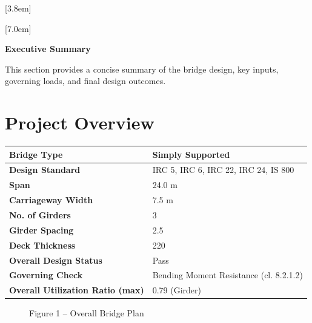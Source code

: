 \documentclass[12pt,a4paper]{report}
\numberwithin{table}{chapter}
\numberwithin{figure}{chapter}
\begin{document}
[3.8em]
  {\normalfont}
  {\contentslabel{2.3em}}
  {\hspace*{-2.3em}}
  {\hfill\contentspage}

[7.0em]
  {\normalfont}
  {\contentslabel{3.2em}}
  {\hspace*{-3.2em}}
  {\hfill\contentspage}

\newpage
\renewcommand{\contentsname}{\centering\Large\bfseries Table of Contents}
\tableofcontents


\newpage
{\centering\Large\bfseries Executive Summary\par}
\vspace{0.8em}

This section provides a concise summary of the bridge design, key inputs, governing loads, and final design outcomes.

\section*{Project Overview}
\label{sec:project-overview}


\begin{tabular}{|L{5.5cm}|L{8.5cm}|}
\hline
\textbf{Bridge Type} & Simply Supported \\
\hline
\textbf{Design Standard} & IRC 5, IRC 6, IRC 22, IRC 24, IS 800 \\
\hline
\textbf{Span} & 24.0 m \\
\hline
\textbf{Carriageway Width} & 7.5 m \\
\hline
\textbf{No. of Girders} & 3 \\
\hline
\textbf{Girder Spacing} & 2.5 \\
\hline
\textbf{Deck Thickness} & 220 \\
\hline
\textbf{Overall Design Status} & Pass \\
\hline
\textbf{Governing Check} & Bending Moment Resistance (cl. 8.2.1.2) \\
\hline
\textbf{Overall Utilization Ratio (max)} & 0.79 (Girder) \\
\hline
\end{tabular}


\begin{figure}[H]
\centering
{}
\caption*{Figure 1 -- Overall Bridge Plan}
\end{figure}
\end{document}

